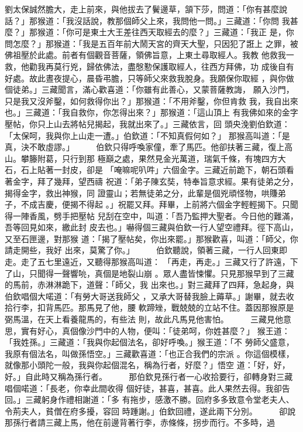\begin{pinyinscope}
{劉太保誠然膽大，走上前來，與他拔去了鬢邊草，頷下莎，問道：「你有甚麼說
話？」那猴道：「我沒話說，教那個師父上來，我問他一問。」三藏道：「你問
我甚麼？」那猴道：「你可是東土大王差往西天取經去的麼？」三藏道：「我正
是，你問怎麼？」那猴道：「我是五百年前大鬧天宮的齊天大聖，只因犯了誑上
之罪，被佛祖壓於此處。前者有個觀音菩薩，領佛旨意，上東土尋取經人。我教
他救我一救，他勸我再莫行兇，歸依佛法，盡慇懃保護取經人，往西方拜佛，功
成後自有好處。故此晝夜提心，晨昏弔膽，只等師父來救我脫身。我願保你取經
，與你做個徒弟。」三藏聞言，滿心歡喜道：「你雖有此善心，又蒙菩薩教誨，
願入沙門，只是我又沒斧鑿，如何救得你出？」那猴道：「不用斧鑿，你但肯救
我，我自出來也。」三藏道：「我自救你，你怎得出來？」那猴道：「這山頂上
有我佛如來的金字壓帖，你只上山去將帖兒揭起，我就出來了。」三藏依言，回
頭央浼劉伯欽道：「太保呵，我與你上山走一遭。」伯欽道：「不知真假何如？」
那猴高叫道：「是真，決不敢虛謬。」
　　
伯欽只得呼喚家僮，牽了馬匹。他卻扶著三藏，復上高山。攀籐附葛，只行到那
極巔之處，果然見金光萬道，瑞氣千條，有塊四方大石，石上貼著一封皮，卻是
「唵嘛呢叭吽」六個金字。三藏近前跪下，朝石頭看著金字，拜了幾拜，望西禱
祝道：「弟子陳玄奘，特奉旨意求經。果有徒弟之分，揭得金字，救出神猴，同
證靈山；若無徒弟之分，此輩是個兇頑怪物，哄賺弟子，不成吉慶，便揭不得起
。」祝罷又拜。拜畢，上前將六個金字輕輕揭下。只聞得一陣香風，劈手把壓帖
兒刮在空中，叫道：「吾乃監押大聖者。今日他的難滿，吾等回見如來，繳此封
皮去也。」嚇得個三藏與伯欽一行人望空禮拜。徑下高山，又至石匣邊，對那猴
道：「揭了壓帖矣，你出來罷。」那猴歡喜，叫道：「師父，你請走開些，我好
出來，莫驚了你。」
　　
伯欽聽說，領著三藏，一行人回東即走。走了五七里遠近，又聽得那猴高叫道：
「再走，再走。」三藏又行了許遠，下了山，只聞得一聲響喨，真個是地裂山崩
。眾人盡皆悚懼。只見那猴早到了三藏的馬前，赤淋淋跪下，道聲：「師父，我
出來也。」對三藏拜了四拜，急起身，與伯欽唱個大喏道：「有勞大哥送我師父
，又承大哥替我臉上薅草。」謝畢，就去收拾行李，扣背馬匹。那馬見了他，腰
軟蹄矬，戰兢兢的立站不住。蓋因那猴原是弼馬溫，在天上看養龍馬的，有些法
則，故此凡馬見他害怕。
　　
三藏見他意思，實有好心，真個像沙門中的人物，便叫：「徒弟呵，你姓甚麼？」
猴王道：「我姓孫。」三藏道：「我與你起個法名，卻好呼喚。」猴王道：「不
勞師父盛意，我原有個法名，叫做孫悟空。」三藏歡喜道：「也正合我們的宗派
。你這個模樣，就像那小頭陀一般，我與你起個混名，稱為行者，好麼？」悟空
道：「好，好，好。」自此時又稱為孫行者。
　　
那伯欽見孫行者一心收拾要行，卻轉身對三藏唱個喏道：「長老，你幸此間收得
個好徒，甚喜，甚喜。此人果然去得。我卻告回。」三藏躬身作禮相謝道：「多
有拖步，感激不勝。回府多多致意令堂老夫人、令荊夫人，貧僧在府多擾，容回
時踵謝。」伯欽回禮，遂此兩下分別。
　　
卻說那孫行者請三藏上馬，他在前邊背著行李，赤條條，拐步而行。不多時，過
}
\end{pinyinscope}
